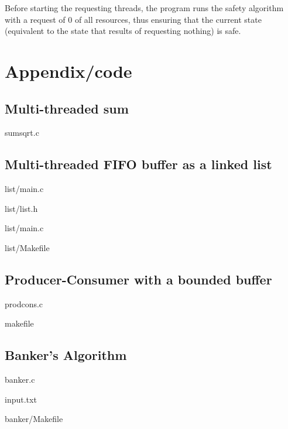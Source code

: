 \documentclass[a4paper, titlepage]{article}
\begin{document}
Before starting the requesting threads, the program runs the safety algorithm
with a request of 0 of all resources, thus ensuring that the current state
(equivalent to the state that results of requesting nothing) is safe.

\pagebreak
\section{Appendix/code}
\subsection{Multi-threaded sum}
sumsqrt.c

\subsection{Multi-threaded FIFO buffer as a linked list}
list/main.c

list/list.h

list/main.c

list/Makefile

\subsection{Producer-Consumer with a bounded buffer}
prodcons.c

makefile

\subsection{Banker's Algorithm}
banker.c

input.txt

banker/Makefile

\end{document}
